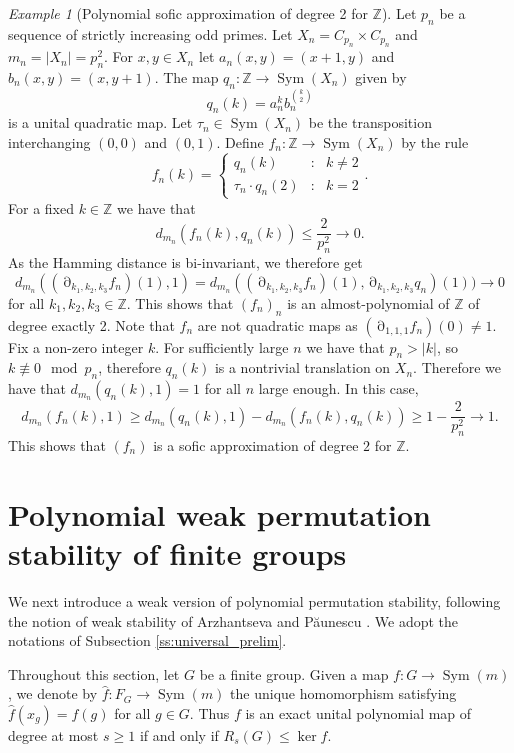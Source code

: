 \documentclass[a4paper,12pt]{amsart}
\theoremstyle{plain}
\theoremstyle{definition}
\theoremstyle{remark}
\newtheorem{example}[subsection]{{\it Example}}
\numberwithin{equation}{subsection}
\DeclareMathOperator{\Sym}{Sym}
\DeclareMathOperator{\mypartial}{\partial}
\begin{document}
\begin{example}[Polynomial sofic approximation of degree 2 for $\mathbb{Z}$]
    \label{ex:polysofZ}
    Let $p_n$ be a sequence of strictly increasing odd primes. Let $X_n=C_{p_n}\times C_{p_n}$ and $m_n=|X_n|=p_n^2$. For $x,y\in X_n$ let $a_n(x,y)=(x+1,y)$ and $b_n(x,y)=(x,y+1)$. The map $q_n:\mathbb{Z}\to\Sym(X_n)$ given by 
    $$q_n(k)=a_n^kb_n^{{k\choose 2}}$$
    is a unital quadratic map. Let $\tau_n\in\Sym(X_n)$ be the transposition interchanging $(0,0)$ and $(0,1)$. Define $f_n:\mathbb{Z}\to\Sym(X_n)$ by the rule
    $$f_n(k)=\left\{ \begin{array}{ccc}
        q_n(k) & : & k\neq 2\\
        \tau_n\cdot q_n(2) & : & k=2
    \end{array}
    \right . .$$
    For a fixed $k\in\mathbb{Z}$ we have that
    $$d_{m_n}(f_n(k),q_n(k))\le \frac{2}{p_n^2}\rightarrow 0.$$
    As the Hamming distance is bi-invariant, we therefore get
    $$d_{m_n}((\mypartial_{k_1,k_2,k_3}f_n)(1), 1)=
    d_{m_n}((\mypartial_{k_1,k_2,k_3}f_n)(1),\mypartial_{k_1,k_2,k_3}q_n)(1))\rightarrow 0$$
    for all $k_1,k_2,k_3\in\mathbb{Z}$. This shows that $(f_n)_n$ is an almost-polynomial of $\mathbb{Z}$ of degree exactly 2. Note that $f_n$ are not quadratic maps as $(\mypartial_{1,1,1}f_n)(0)\neq 1$. Fix a non-zero integer $k$. For sufficiently large $n$ we have that $p_n>|k|$, so $k\not\equiv 0\mod p_n$, therefore $q_n(k)$ is a nontrivial translation on $X_n$. Therefore we have that $d_{m_n}(q_n(k),1)=1$ for all $n$ large enough. In this case,
    $$d_{m_n}(f_n(k),1)\ge d_{m_n}(q_n(k),1)-d_{m_n}(f_n(k),q_n(k))\ge 1-\frac{2}{p_n^2}\rightarrow 1.$$
    This shows that $(f_n)$ is a sofic approximation of degree $2$ for $\mathbb{Z}$.
\end{example}


\section{Polynomial weak permutation stability of finite groups}
\label{s:weakpolypermut}

\noindent
We next introduce a weak version of polynomial permutation stability,
following the notion of weak stability of Arzhantseva and
P\u{a}unescu \cite[Section7]{AP15}. We adopt the notations of Subsection \ref{ss:universal_prelim}.

Throughout this section, let $G$ be a finite group.  
Given a map
$f:G\longrightarrow\Sym(m)$,
we denote by
$\widehat f:F_G\longrightarrow\Sym(m)$
the unique homomorphism satisfying
$\widehat f(x_g)=f(g)$ for all $g\in G$. 
Thus $f$ is an exact unital polynomial map of degree at most $s\ge 1$ if and only if
$R_s(G)\leq\ker\widehat f$.
\end{document}

